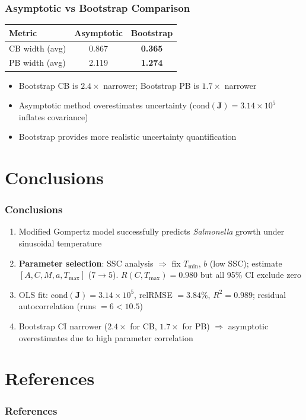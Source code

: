 \documentclass[10pt,aspectratio=169]{beamer}
\begin{document}
\begin{frame}
	\frametitle{Asymptotic vs Bootstrap Comparison}
	\begin{table}[ht]
		\centering
		\begin{tabular}{lcc}
			\toprule
			Metric & Asymptotic & Bootstrap \\
			\midrule
			CB width (avg) & 0.867 & \textbf{0.365} \\
			PB width (avg) & 2.119 & \textbf{1.274} \\
			\bottomrule
		\end{tabular}
	\end{table}
	\vspace{0.5em}
	\begin{itemize}
		\item Bootstrap CB is $\mathbf{2.4\times}$ narrower; Bootstrap PB is $\mathbf{1.7\times}$ narrower
		\item Asymptotic method overestimates uncertainty ($\text{cond}(\mathbf{J})=3.14\times10^5$ inflates covariance)
		\item Bootstrap provides more realistic uncertainty quantification
	\end{itemize}
\end{frame}

\section{Conclusions}
\begin{frame}
	\frametitle{Conclusions}
	\begin{enumerate}
		\item Modified Gompertz model successfully predicts \textit{Salmonella} growth under sinusoidal temperature
		\item \textbf{Parameter selection}: SSC analysis $\Rightarrow$ fix $T_{\min}$, $b$ (low SSC); estimate $[A, C, M, a, T_{\max}]$ ($7 \to 5$). $R(C,T_{\max})=0.980$ but all 95\% CI exclude zero
		\item OLS fit: $\text{cond}(\mathbf{J})=3.14\times10^5$, relRMSE $= 3.84\%$, $R^2 = 0.989$; residual autocorrelation (runs $= 6 < 10.5$)
		\item Bootstrap CI narrower ($2.4\times$ for CB, $1.7\times$ for PB) $\Rightarrow$ asymptotic overestimates due to high parameter correlation
	\end{enumerate}
\end{frame}

\section{References}
\begin{frame}[allowframebreaks]
    \frametitle{References}
\end{frame}
\end{document}
